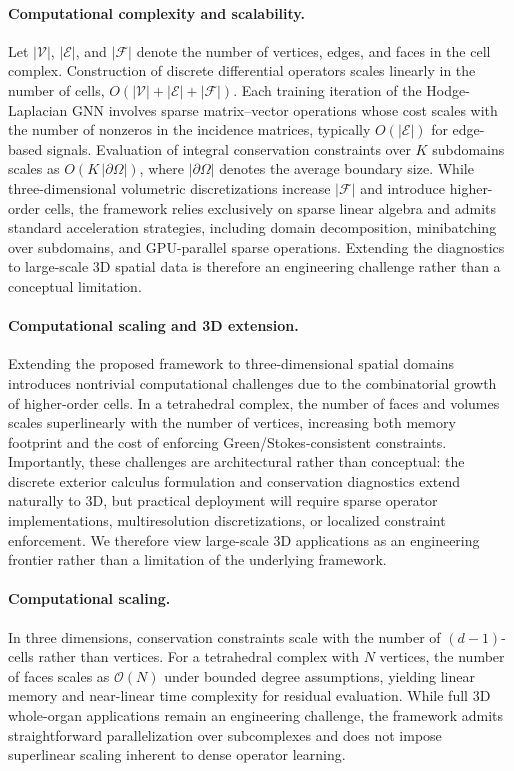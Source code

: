 \documentclass[10pt,article]{article}
\begin{document}
\paragraph{Computational complexity and scalability.}
Let $|\mathcal{V}|$, $|\mathcal{E}|$, and $|\mathcal{F}|$ denote the number of vertices, edges, and faces in the cell complex. Construction of discrete differential operators scales linearly in the number of cells, $O(|\mathcal{V}| + |\mathcal{E}| + |\mathcal{F}|)$. Each training iteration of the Hodge-Laplacian GNN involves sparse matrix–vector operations whose cost scales with the number of nonzeros in the incidence matrices, typically $O(|\mathcal{E}|)$ for edge-based signals. Evaluation of integral conservation constraints over $K$ subdomains scales as $O(K\,|\partial\Omega|)$, where $|\partial\Omega|$ denotes the average boundary size. While three-dimensional volumetric discretizations increase $|\mathcal{F}|$ and introduce higher-order cells, the framework relies exclusively on sparse linear algebra and admits standard acceleration strategies, including domain decomposition, minibatching over subdomains, and GPU-parallel sparse operations. Extending the diagnostics to large-scale 3D spatial data is therefore an engineering challenge rather than a conceptual limitation.

\paragraph{Computational scaling and 3D extension.}
Extending the proposed framework to three-dimensional spatial domains introduces nontrivial computational challenges due to the combinatorial growth of higher-order cells. In a tetrahedral complex, the number of faces and volumes scales superlinearly with the number of vertices, increasing both memory footprint and the cost of enforcing Green/Stokes-consistent constraints. Importantly, these challenges are architectural rather than conceptual: the discrete exterior calculus formulation and conservation diagnostics extend naturally to 3D, but practical deployment will require sparse operator implementations, multiresolution discretizations, or localized constraint enforcement. We therefore view large-scale 3D applications as an engineering frontier rather than a limitation of the underlying framework.

\paragraph{Computational scaling.}
In three dimensions, conservation constraints scale with the number of $(d-1)$-cells rather than vertices. For a tetrahedral complex with $N$ vertices, the number of faces scales as $\mathcal{O}(N)$ under bounded degree assumptions, yielding linear memory and near-linear time complexity for residual evaluation. While full 3D whole-organ applications remain an engineering challenge, the framework admits straightforward parallelization over subcomplexes and does not impose superlinear scaling inherent to dense operator learning.
\end{document}
